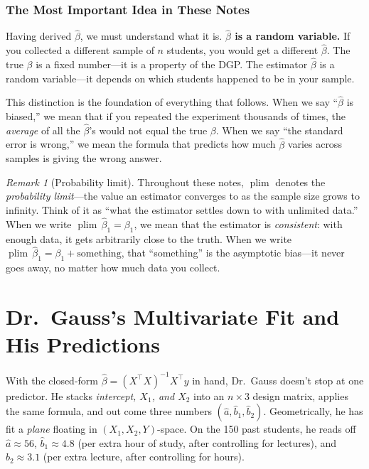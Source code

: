 \documentclass[11pt,a4paper]{article}
\theoremstyle{definition}
\theoremstyle{plain}
\theoremstyle{remark}
\newtheorem{remark}{Remark}[section]
\newcommand{\plim}{\operatorname{plim}}
\newcommand{\bhat}{\hat{\beta}}
\begin{document}
\subsubsection*{The Most Important Idea in These Notes}

Having derived $\bhat$, we must understand what it is. \textbf{$\bhat$ is a random variable.} If you collected a different sample of $n$ students, you would get a different $\bhat$. The true $\beta$ is a fixed number---it is a property of the DGP. The estimator $\bhat$ is a random variable---it depends on which students happened to be in your sample.

This distinction is the foundation of everything that follows. When we say ``$\bhat$ is biased,'' we mean that if you repeated the experiment thousands of times, the \emph{average} of all the $\bhat$'s would not equal the true $\beta$. When we say ``the standard error is wrong,'' we mean the formula that predicts how much $\bhat$ varies across samples is giving the wrong answer.

\begin{remark}[Probability limit]
Throughout these notes, $\plim$ denotes the \emph{probability limit}---the value an estimator converges to as the sample size grows to infinity. Think of it as ``what the estimator settles down to with unlimited data.'' When we write $\plim\, \bhat_1 = \beta_1$, we mean that the estimator is \emph{consistent}: with enough data, it gets arbitrarily close to the truth. When we write $\plim\, \bhat_1 = \beta_1 + \text{something}$, that ``something'' is the asymptotic bias---it never goes away, no matter how much data you collect.
\end{remark}

\section{Dr.\ Gauss's Multivariate Fit and His Predictions}\label{sec:gauss-fit}

With the closed-form $\bhat = (X^\top X)^{-1} X^\top y$ in hand, Dr.\ Gauss doesn't stop at one predictor. He stacks \emph{intercept, $X_1$, and $X_2$} into an $n \times 3$ design matrix, applies the same formula, and out come three numbers $(\hat a, \hat b_1, \hat b_2)$. Geometrically, he has fit a \emph{plane} floating in $(X_1, X_2, Y)$-space. On the 150 past students, he reads off $\hat a \approx 56$, $\hat b_1 \approx 4.8$ (per extra hour of study, after controlling for lectures), and $\hat b_2 \approx 3.1$ (per extra lecture, after controlling for hours).
\end{document}
